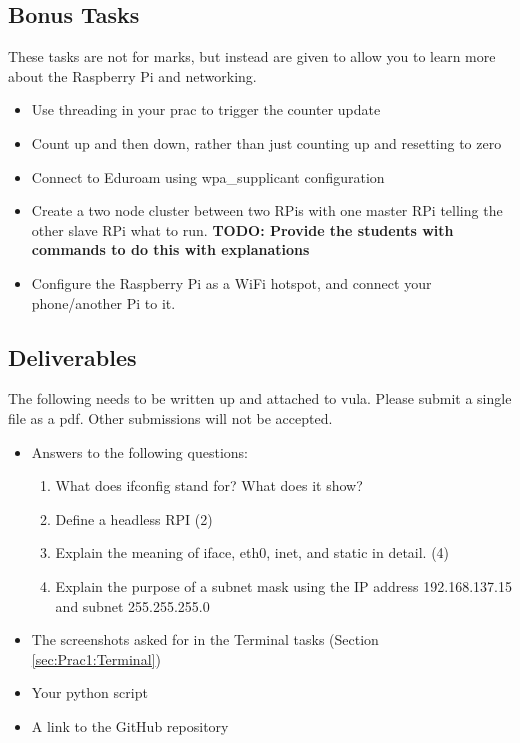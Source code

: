 \subsection{Bonus Tasks}
These tasks are not for marks, but instead are given to allow you to learn more about the Raspberry Pi and networking. 
\begin{itemize}
    \item Use threading in your prac to trigger the counter update
    \item Count up and then down, rather than just counting up and resetting to zero
    \item Connect to Eduroam using wpa\_supplicant configuration
    \item Create a two node cluster between two RPis with one master RPi telling the other slave RPi what to run. \textbf{TODO: Provide the students with commands to do this with explanations} 
    \item Configure the Raspberry Pi as a WiFi hotspot, and connect your phone/another Pi to it.
\end{itemize}

\subsection{Deliverables}
The following needs to be written up and attached to vula. Please submit a single file as a pdf. Other submissions will not be accepted.
\begin{itemize}
    \item Answers to the following questions:
        \begin{enumerate}
            \item What does ifconfig stand for? What does it show?
            \item Define a headless RPI (2)
            \item Explain the meaning of iface, eth0, inet, and static in detail. (4)
            \item Explain the purpose of a subnet mask using the IP address 192.168.137.15 and subnet 255.255.255.0
        \end{enumerate}
    \item The screenshots asked for in the Terminal tasks (Section \ref{sec:Prac1:Terminal})
    \item Your python script
    \item A link to the GitHub repository
\end{itemize}